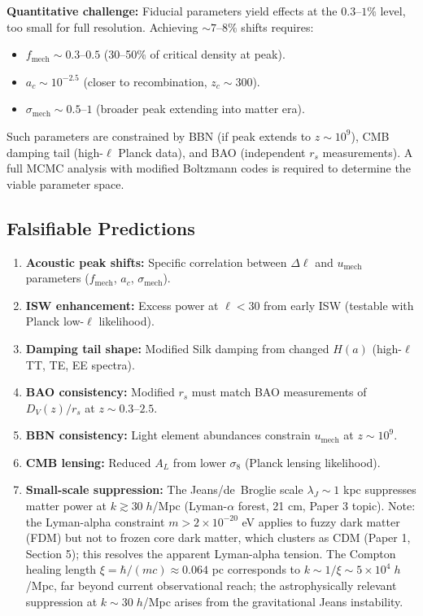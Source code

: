 \documentclass[11pt,a4paper]{article}
\newcommand{\umech}{\ensuremath{u_{\mathrm{mech}}}}
\newcommand{\fmech}{\ensuremath{f_{\mathrm{mech}}}}
\newcommand{\ac}{\ensuremath{a_c}}
\newcommand{\sigmamech}{\ensuremath{\sigma_{\mathrm{mech}}}}
\newcommand{\rs}{\ensuremath{r_s}}
\theoremstyle{definition}
\theoremstyle{remark}
\begin{document}
\textbf{Quantitative challenge:} Fiducial parameters yield effects at the $0.3$--$1\%$ level, too small for full resolution. Achieving $\sim 7$--$8\%$ shifts requires:
\begin{itemize}[leftmargin=*, itemsep=0.2em]
\item $\fmech \sim 0.3$--$0.5$ (30--50\% of critical density at peak).
\item $\ac \sim 10^{-2.5}$ (closer to recombination, $z_c \sim 300$).
\item $\sigmamech \sim 0.5$--$1$ (broader peak extending into matter era).
\end{itemize}

Such parameters are constrained by BBN (if peak extends to $z \sim 10^9$), CMB damping tail (high-$\ell$ Planck data), and BAO (independent $\rs$ measurements). A full MCMC analysis with modified Boltzmann codes is required to determine the viable parameter space.

\subsection{Falsifiable Predictions}
\label{sec:falsifiable}

\begin{enumerate}[leftmargin=*, itemsep=0.3em]
\item \textbf{Acoustic peak shifts:} Specific correlation between $\Delta\ell$ and $\umech$ parameters ($\fmech$, $\ac$, $\sigmamech$).

\item \textbf{ISW enhancement:} Excess power at $\ell < 30$ from early ISW (testable with Planck low-$\ell$ likelihood).

\item \textbf{Damping tail shape:} Modified Silk damping from changed $H(a)$ (high-$\ell$ TT, TE, EE spectra).

\item \textbf{BAO consistency:} Modified $\rs$ must match BAO measurements of $D_V(z)/\rs$ at $z \sim 0.3$--$2.5$.

\item \textbf{BBN consistency:} Light element abundances constrain $\umech$ at $z \sim 10^9$.

\item \textbf{CMB lensing:} Reduced $A_L$ from lower $\sigma_8$ (Planck lensing likelihood).

\item \textbf{Small-scale suppression:} The Jeans/de~Broglie scale $\lambda_J \sim 1$ kpc suppresses matter power at $k \gtrsim 30\; h$/Mpc (Lyman-$\alpha$ forest, 21 cm, Paper 3 topic). Note: the Lyman-alpha constraint $m > 2 \times 10^{-20}$ eV applies to fuzzy dark matter (FDM) but not to frozen core dark matter, which clusters as CDM (Paper 1, Section 5); this resolves the apparent Lyman-alpha tension. The Compton healing length $\xi = \hbar/(mc) \approx 0.064$ pc corresponds to $k \sim 1/\xi \sim 5 \times 10^4\; h$/Mpc, far beyond current observational reach; the astrophysically relevant suppression at $k \sim 30\; h$/Mpc arises from the gravitational Jeans instability.
\end{enumerate}
\end{document}
